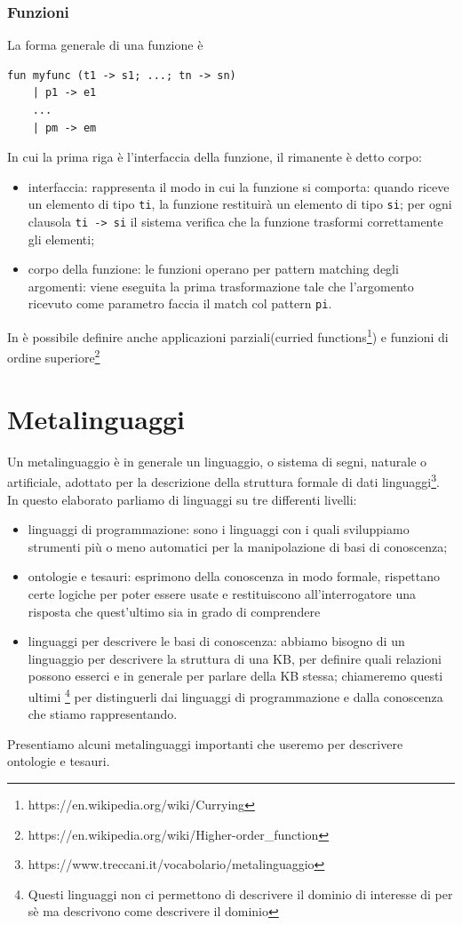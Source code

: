 \subsubsection{Funzioni}
La forma generale di una funzione è
\begin{verbatim}
fun myfunc (t1 -> s1; ...; tn -> sn)
	| p1 -> e1
	...
	| pm -> em
\end{verbatim}
In cui la prima riga è l'interfaccia della funzione, il rimanente è detto corpo:
\begin{itemize}
	\item interfaccia: rappresenta il modo in cui la funzione si comporta: quando riceve un elemento di tipo \verb|ti|, la funzione restituirà un elemento di tipo \verb|si|; per ogni clausola \verb|ti -> si| il sistema verifica che la funzione trasformi correttamente gli elementi;
	\item corpo della funzione: le funzioni operano per pattern matching degli argomenti: viene eseguita la prima trasformazione tale che l'argomento ricevuto come parametro faccia il match col pattern \verb|pi|. 
\end{itemize}
In \cduce è possibile definire anche applicazioni parziali(curried functions\footnote{https://en.wikipedia.org/wiki/Currying}) e funzioni di ordine superiore\footnote{https://en.wikipedia.org/wiki/Higher-order\_function}
\section{Metalinguaggi}
Un metalinguaggio è in generale un linguaggio, o sistema di segni, naturale o artificiale, adottato per la descrizione della struttura formale di dati linguaggi\footnote{https://www.treccani.it/vocabolario/metalinguaggio}. In questo elaborato parliamo di linguaggi su tre differenti livelli:
\begin{itemize}
	\item linguaggi di programmazione: sono i linguaggi con i quali sviluppiamo strumenti più o meno automatici per la manipolazione di basi di conoscenza;
	\item ontologie e tesauri: esprimono della conoscenza in modo formale, rispettano certe logiche per poter essere usate e restituiscono all'interrogatore una risposta che quest'ultimo sia in grado di comprendere
	\item linguaggi per descrivere le basi di conoscenza: abbiamo bisogno di un linguaggio per descrivere la struttura di una KB, per definire quali relazioni possono esserci e in generale per parlare della KB stessa; chiameremo questi ultimi \footnote{Questi linguaggi non ci permettono di descrivere il dominio di interesse di per sè ma descrivono come descrivere il dominio} per distinguerli dai linguaggi di programmazione e dalla conoscenza che stiamo rappresentando.
\end{itemize}
Presentiamo alcuni metalinguaggi importanti che useremo per descrivere ontologie e tesauri.
